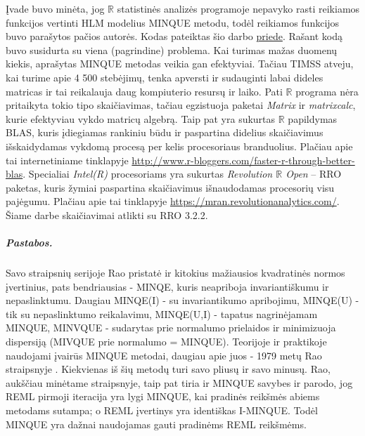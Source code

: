 \documentclass[12pt,a4paper]{article}
\newcommand{\R}{{\mathbb R}}
\begin{document}
\indent Įvade  buvo minėta, jog $\R$ statistinės analizės programoje nepavyko rasti reikiamos funkcijos vertinti HLM modelius MINQUE metodu, todėl reikiamos funkcijos buvo parašytos pačios autorės. Kodas pateiktas šio darbo \hyperlink{appendix}{priede}. Rašant kodą buvo susidurta su viena (pagrindine) problema. Kai turimas mažas duomenų kiekis, aprašytas MINQUE metodas veikia gan efektyviai. Tačiau TIMSS atveju, kai turime apie 4 500 stebėjimų, tenka apversti ir sudauginti labai dideles matricas ir tai reikalauja daug kompiuterio resursų ir laiko. Pati $\R$ programa nėra pritaikyta tokio tipo skaičiavimas, tačiau egzistuoja paketai \textit{Matrix} ir \textit{matrixcalc}, kurie efektyviau vykdo matricų algebrą. Taip pat yra sukurtas $\R$ papildymas BLAS, kuris įdiegiamas rankiniu būdu ir paspartina didelius skaičiavimus išskaidydamas vykdomą procesą per kelis procesoriaus branduolius. Plačiau apie tai internetiniame tinklapyje \url{http://www.r-bloggers.com/faster-r-through-better-blas}. Specialiai \textit{Intel(R)} procesoriams yra sukurtas \textit{Revolution $\R$ Open} -- RRO paketas, kuris žymiai paspartina skaičiavimus išnaudodamas procesorių visu pajėgumu. Plačiau apie tai tinklapyje \url{https://mran.revolutionanalytics.com/}. Šiame darbe skaičiavimai atlikti su RRO 3.2.2.

\subparagraph{Pastabos.} Savo straipsnių serijoje Rao pristatė ir kitokius mažiausios kvadratinės normos įvertinius, pats bendriausias - MINQE, kuris neapriboja invariantiškumu ir nepaslinktumu. Daugiau MINQE(I) - su invariantikumo apribojimu, MINQE(U) - tik su nepaslinktumo reikalavimu, MINQE(U,I) - tapatus nagrinėjamam MINQUE, MINVQUE - sudarytas prie normalumo prielaidos ir minimizuoja dispersiją (MIVQUE prie normalumo = MINQUE). Teorijoje ir praktikoje naudojami įvairūs MINQUE metodai, daugiau apie juos - 1979 metų Rao straipsnyje \cite{minquereml3}. Kiekvienas iš šių metodų turi savo pliusų ir savo minusų. Rao, aukščiau minėtame straipsnyje, taip pat tiria ir MINQUE savybes ir parodo, jog REML pirmoji iteracija yra lygi MINQUE, kai pradinės reikšmės abiems metodams sutampa; o REML įvertinys yra identiškas I-MINQUE. Todėl MINQUE yra dažnai naudojamas gauti pradinėms REML reikšmėms.
\end{document}
